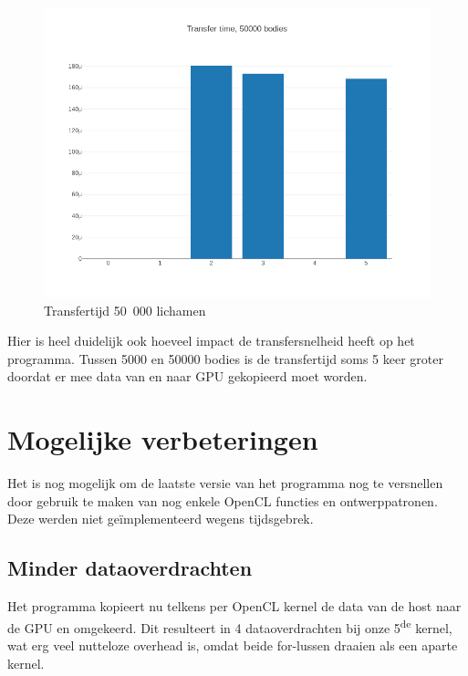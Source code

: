 \documentclass{article}
\begin{document}
\begin{figure}[H]
    \includegraphics[width=\linewidth]{./grafiekskes/hist_transfer50000.png}
    \caption{Transfertijd 50~000 lichamen}
\end{figure}

Hier is heel duidelijk ook hoeveel impact de transfersnelheid heeft op het programma.
Tussen 5000 en 50000 bodies is de transfertijd soms 5 keer groter doordat er mee data
van en naar GPU gekopieerd moet worden.

\section{Mogelijke verbeteringen}
\label{hfd:verbeteringen}
Het is nog mogelijk om de laatste versie van het programma nog te versnellen door
gebruik te maken van nog enkele OpenCL functies en ontwerppatronen. Deze werden
niet ge\"{i}mplementeerd wegens tijdsgebrek.

\subsection{Minder dataoverdrachten}
\label{hfd:dataoverdrachten}
Het programma kopieert nu telkens per OpenCL kernel de data van de host naar de GPU en
omgekeerd. Dit resulteert in 4 dataoverdrachten bij onze 5\textsuperscript{de} kernel,
wat erg veel nutteloze overhead is, omdat beide for-lussen draaien als een aparte kernel.
\end{document}
